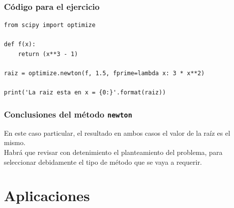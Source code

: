 \begin{frame}
\frametitle{Código para el ejercicio}
\begin{lstlisting}[caption=Código que usa \texttt{optimize.newton} con la derivada de la función, style=codigopython]
from scipy import optimize

def f(x):
    return (x**3 - 1)

raiz = optimize.newton(f, 1.5, fprime=lambda x: 3 * x**2)

print('La raiz esta en x = {0:}'.format(raiz))
\end{lstlisting}
\end{frame}
\begin{frame}
\frametitle{Conclusiones del método \texttt{newton}}
En este caso particular, el resultado en ambos casos el valor de la raíz es el mismo.
\\
\bigskip
Habrá que revisar con detenimiento el planteamiento del problema, para seleccionar debidamente el tipo de método que se vaya a requerir.
\end{frame}
\section{Aplicaciones}
